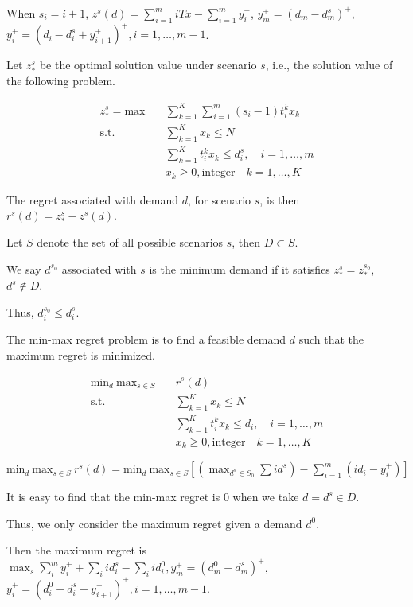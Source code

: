 When $s_i = i+1$, $z^{s}(d) = \sum_{i=1}^{m} i Tx - \sum_{i=1}^{m} y_{i}^{+}$, $y_{m}^{+} = (d_{m} - d_{m}^{s})^{+}$, $y_{i}^{+} = (d_{i} - d_{i}^{s} + y_{i+1}^{+})^{+}, i = 1, \ldots, m-1$.

Let $z^{s}_{*}$ be the optimal solution value under scenario $s$, i.e., the solution value of the following problem.

\begin{align*}
  z^{s}_{*} = \mbox{max}\quad & \sum_{k=1}^K \sum_{i=1}^m (s_i-1) t_{i}^{k}x_{k} \\
  \mbox{s.t.} \quad & \sum_{k=1}^K x_{k} \leq N \\
  & \sum_{k=1}^K t_i^k x_k \leq d_i^{s},\quad i=1,\ldots,m \\
  & x_{k} \geq 0, \mbox{integer} \quad k = 1,\ldots,K
\end{align*}

The regret associated with demand $d$, for scenario $s$, is then $r^{s}(d) = z^{s}_{*} - z^{s}(d)$.

Let $S$ denote the set of all possible scenarios $s$, then $D \subset S$.

\begin{definition}
  We say $d^{s_0}$ associated with $s$ is the minimum demand if it satisfies $z^{s}_{*} = z^{s_0}_{*}$, $d^{s} \notin D$.
\end{definition}

Thus, $d^{s_0}_{i} \leq d^{s}_{i}$.

The min-max regret problem is to find a feasible demand $d$ such that the maximum regret is minimized.

\begin{align*}
  \mbox{min}_{d} \ \mbox{max}_{s \in S}\quad & r^{s}(d) \\
  \mbox{s.t.} \quad & \sum_{k=1}^K x_{k} \leq N \\
  & \sum_{k=1}^K t_i^k x_k \leq d_i,\quad i=1,\ldots,m \\
  & x_{k} \geq 0, \mbox{integer} \quad k = 1,\ldots,K
\end{align*}

$\mbox{min}_{d} \ \mbox{max}_{s \in S} \ r^{s}(d) = \mbox{min}_{d} \ \mbox{max}_{s \in S} [(\max_{d^{s} \in S_0} \sum i d^{s}) - \sum_{i=1}^{m} (i d_i - y_{i}^{+})]$

It is easy to find that the min-max regret is 0 when we take $d = d^{s} \in D$.

Thus, we only consider the maximum regret given a demand $d^{0}$.

Then the maximum regret is $\max_{s} \sum_{i}^{m} y_{i}^{+} + \sum_{i} i d^{s}_{i} - \sum_{i} i d^{0}_{i}, y_{m}^{+} = (d_{m}^{0} - d_{m}^{s})^{+}$, $y_{i}^{+} = (d_{i}^{0} - d_{i}^{s} + y_{i+1}^{+})^{+}, i = 1, \ldots, m-1$.

